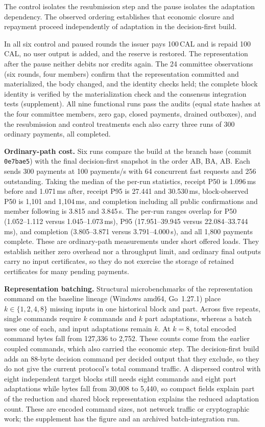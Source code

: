 The control isolates the resubmission
step and the pause isolates the adaptation dependency. The observed ordering establishes that economic closure and repayment
proceed independently of adaptation in the decision-first build.

In all six control and paused rounds the issuer pays 100\,CAL and is repaid
100\,CAL, no user output is added, and the reserve is restored. The
representation after the pause neither debits nor credits again. The 24
committee observations (six rounds, four members) confirm that the
representation committed and materialized, the body changed, and the identity
checks held; the complete block identity is verified by the materialization
check and the consensus integration tests (supplement). All nine
functional runs pass the audits (equal state hashes at the four committee
members, zero gap, closed payments, drained outboxes), and the resubmission
and control treatments each also carry three runs of 300 ordinary payments, all
completed.

\noindent\textbf{Ordinary-path cost.}
Six runs compare the build at the branch base (commit \texttt{0e7bae5}) with
the final decision-first snapshot in the order AB, BA, AB. Each sends 300
payments at 100 payments/s with 64 concurrent fast requests and 256
outstanding. Taking the median of the per-run statistics, receipt P50 is
1.096\,ms before and 1.071\,ms after, receipt P95 is 27.441 and 30.530\,ms,
block-observed P50 is 1,101 and 1,104\,ms, and completion including all public
confirmations and member following is 3.815 and 3.845\,s. The per-run ranges
overlap for P50 (1.052--1.112 versus 1.045--1.073\,ms), P95 (17.951--39.945
versus 22.084--33.744\,ms), and completion (3.805--3.871 versus
3.791--4.000\,s), and all 1,800 payments complete. These are ordinary-path measurements under short offered loads. They establish neither zero overhead nor
a throughput limit, and ordinary final outputs carry no input certificates, so
they do not exercise the storage of retained certificates for many pending
payments.

\noindent\textbf{Representation batching.}
Structural microbenchmarks of the representation command on the baseline
lineage (Windows amd64, Go~1.27.1) place $k\in\{1,2,4,8\}$ missing inputs in
one historical block and part. Across five repeats, single commands require
$k$ commands and $k$ part adaptations, whereas a batch uses one of each, and
input adaptations remain $k$. At $k=8$, total encoded command bytes fall from
127,336 to 2,752. These counts come from the earlier coupled commands, which
also carried the economic step. The decision-first build adds an 88-byte
decision command per decided output that they exclude, so they do not give
the current protocol's total command traffic. A dispersed control with eight
independent target blocks still needs eight commands and eight part
adaptations while bytes fall from 30,008 to 5,440, so compact fields explain
part of the reduction and shared block representation explains the reduced
adaptation count. These are encoded command sizes, not network traffic or
cryptographic work; the supplement has the figure and an archived
batch-integration run.

